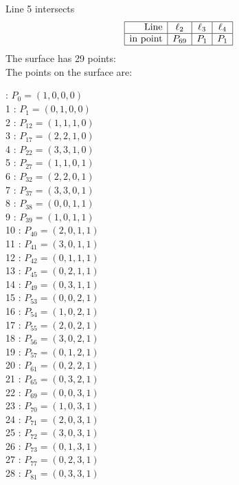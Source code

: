 \documentclass{article}
\begin{document}
{$$$$
Line 5 intersects 
$$
\begin{array}{|r*{3}{|c}|}
\hline
\mbox{Line}  & \ell_{2} & \ell_{3} & \ell_{4}\\
\hline
\mbox{in point}  & P_{69} & P_{1} & P_{1}\\
\hline
\end{array}
$$
The surface has 29 points:\\
The points on the surface are:\\
\begin{multicols}{3}
 : $P_{0}=( 1, 0, 0, 0 )$\\
1 : $P_{1}=( 0, 1, 0, 0 )$\\
2 : $P_{12}=( 1, 1, 1, 0 )$\\
3 : $P_{17}=( 2, 2, 1, 0 )$\\
4 : $P_{22}=( 3, 3, 1, 0 )$\\
5 : $P_{27}=( 1, 1, 0, 1 )$\\
6 : $P_{32}=( 2, 2, 0, 1 )$\\
7 : $P_{37}=( 3, 3, 0, 1 )$\\
8 : $P_{38}=( 0, 0, 1, 1 )$\\
9 : $P_{39}=( 1, 0, 1, 1 )$\\
10 : $P_{40}=( 2, 0, 1, 1 )$\\
11 : $P_{41}=( 3, 0, 1, 1 )$\\
12 : $P_{42}=( 0, 1, 1, 1 )$\\
13 : $P_{45}=( 0, 2, 1, 1 )$\\
14 : $P_{49}=( 0, 3, 1, 1 )$\\
15 : $P_{53}=( 0, 0, 2, 1 )$\\
16 : $P_{54}=( 1, 0, 2, 1 )$\\
17 : $P_{55}=( 2, 0, 2, 1 )$\\
18 : $P_{56}=( 3, 0, 2, 1 )$\\
19 : $P_{57}=( 0, 1, 2, 1 )$\\
20 : $P_{61}=( 0, 2, 2, 1 )$\\
21 : $P_{65}=( 0, 3, 2, 1 )$\\
22 : $P_{69}=( 0, 0, 3, 1 )$\\
23 : $P_{70}=( 1, 0, 3, 1 )$\\
24 : $P_{71}=( 2, 0, 3, 1 )$\\
25 : $P_{72}=( 3, 0, 3, 1 )$\\
26 : $P_{73}=( 0, 1, 3, 1 )$\\
27 : $P_{77}=( 0, 2, 3, 1 )$\\
28 : $P_{81}=( 0, 3, 3, 1 )$\\
\end{multicols}


}
\end{document}
